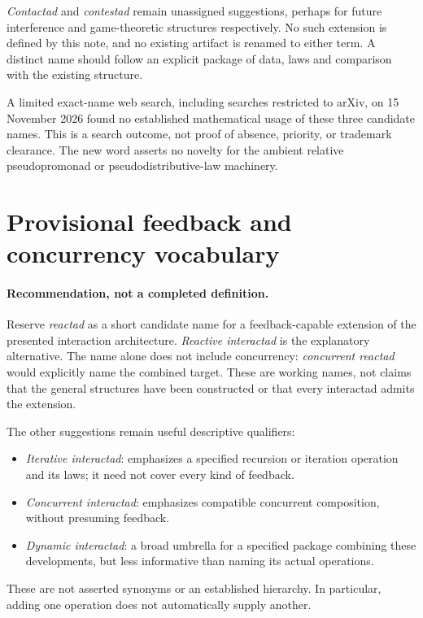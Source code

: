 \documentclass[11pt]{article}
\begin{document}
\emph{Contactad} and \emph{contestad} remain unassigned suggestions, perhaps
for future interference and game-theoretic structures respectively.
No such extension is defined by this note, and no existing artifact is
renamed to either term. A distinct name should follow an explicit package
of data, laws and comparison with the existing structure.

A limited exact-name web search, including searches restricted to arXiv,
on 15 November 2026 found no established mathematical usage of these three
candidate names. This is a search outcome, not proof of absence, priority,
or trademark clearance. The new word asserts no novelty for the ambient
relative pseudopromonad or pseudodistributive-law machinery.

\section{Provisional feedback and concurrency vocabulary}
\paragraph{Recommendation, not a completed definition.}
Reserve \emph{reactad} as a short candidate name for a feedback-capable
extension of the presented interaction architecture. \emph{Reactive
interactad} is the explanatory alternative. The name alone does not include
concurrency: \emph{concurrent reactad} would explicitly name the combined
target. These are working names, not claims that the general structures
have been constructed or that every interactad admits the extension.

The other suggestions remain useful descriptive qualifiers:
\begin{itemize}
\item \emph{Iterative interactad}: emphasizes a specified recursion or
iteration operation and its laws; it need not cover every kind of feedback.
\item \emph{Concurrent interactad}: emphasizes compatible concurrent
composition, without presuming feedback.
\item \emph{Dynamic interactad}: a broad umbrella for a specified package
combining these developments, but less informative than naming its actual
operations.
\end{itemize}
These are not asserted synonyms or an established hierarchy. In particular,
adding one operation does not automatically supply another.
\end{document}
